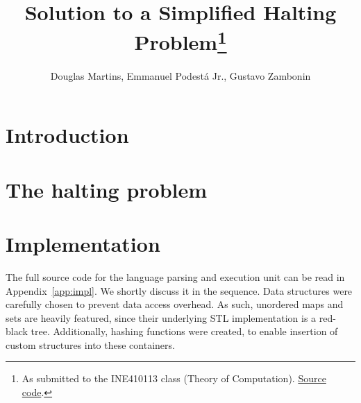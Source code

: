 \documentclass[12pt]{article}
\title{Solution to a Simplified Halting Problem\footnote{
    As submitted to the INE410113 class (Theory of Computation). \href{https://github.com/zambonin/ine410113}{Source code}.}}
\author{Douglas Martins\inst{1}, Emmanuel Podestá Jr.\inst{1}, Gustavo Zambonin\inst{1}}
\begin{document}
 

\maketitle

\section{Introduction}\label{sec:intro}

\section{The halting problem}\label{sec:halting}

\section{Implementation}\label{sec:imp}

The full source code for the language parsing and execution unit can be read in Appendix~\ref{app:impl}. We shortly discuss it in the sequence. Data structures were carefully chosen to prevent data access overhead. As such, unordered maps and sets are heavily featured, since their underlying STL implementation is a red-black tree. Additionally, hashing functions were created, to enable insertion of custom structures into these containers.


\end{document}
